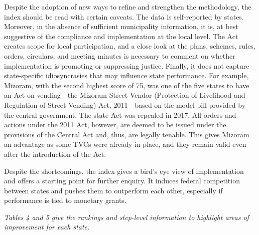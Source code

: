 \documentclass[a4paper, 12pt, twoside]{article}
\begin{document}
	Despite the adoption of new ways to refine and strengthen the methodology, the index should be read with certain caveats. The data is self-reported by states. Moreover, in the absence of sufficient municipality information, it is, at best suggestive of the compliance and implementation at the local level. The Act creates scope for local participation, and a close look at the plans, schemes, rules, orders, circulars, and meeting minutes is necessary to comment on whether implementation is  promoting or suppressing justice. Finally, it does not capture state-specific idiosyncrasies that may influence state performance. For example, Mizoram, with the second highest score of 75, was one of the five states to have an Act on vending—the Mizoram Street Vendor (Protection of Livelihood and Regulation of Street Vending) Act, 2011—based on the model bill provided by the central government. The state Act was repealed in 2017. All orders and actions under the 2011 Act, however, are deemed to be issued under the provisions of the Central Act and, thus, are legally tenable. This gives Mizoram an advantage as some TVCs were already in place, and they remain valid even after the introduction of the Act.

	Despite the shortcomings, the index gives a bird’s eye view of implementation and offers a starting point for further enquiry. It induces federal competition between states and pushes them to outperform each other, especially if performance is tied to monetary grants.
	
	\textit{Tables 4 and 5 give the rankings and step-level information to highlight areas of improvement for each state.} 
\end{document}
